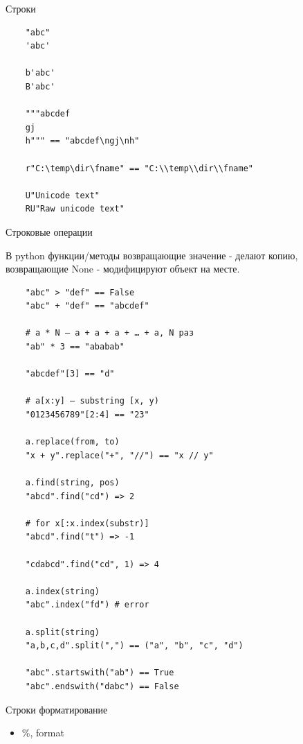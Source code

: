 \documentclass{article}
\begin{document}
\begin{center} Строки \end{center}
\vspace{15pt}
\begin{lstlisting}
	"abc"
	'abc'

	b'abc'
	B'abc'

	"""abcdef
	gj
	h""" == "abcdef\ngj\nh"

	r"C:\temp\dir\fname" == "C:\\temp\\dir\\fname"

	U"Unicode text"
	RU"Raw unicode text"
\end{lstlisting}
\newpage

\begin{center} Строковые операции \end{center}

В python функции/методы возвращающие значение - делают копию, 
	возвращающие None - модифицируют объект на месте.

\vspace{15pt}
\begin{lstlisting}
	"abc" > "def" == False
	"abc" + "def" == "abcdef"

	# a * N – a + a + a + … + a, N раз
	"ab" * 3 == "ababab"

	"abcdef"[3] == "d"

	# a[x:y] – substring [x, y)
	"0123456789"[2:4] == "23"

	a.replace(from, to)
	"x + y".replace("+", "//") == "x // y"

	a.find(string, pos) 
	"abcd".find("cd") => 2
	
	# for x[:x.index(substr)]
	"abcd".find("t") => -1

	"cdabcd".find("cd", 1) => 4

	a.index(string)
	"abc".index("fd") # error

	a.split(string) 
	"a,b,c,d".split(",") == ("a", "b", "c", "d")

	"abc".startswith("ab") == True
	"abc".endswith("dabc") == False
\end{lstlisting}
\newpage

\begin{center} Строки форматирование \end{center}
\begin{itemize}
	\item \%, format
\end{itemize}
\end{document}
